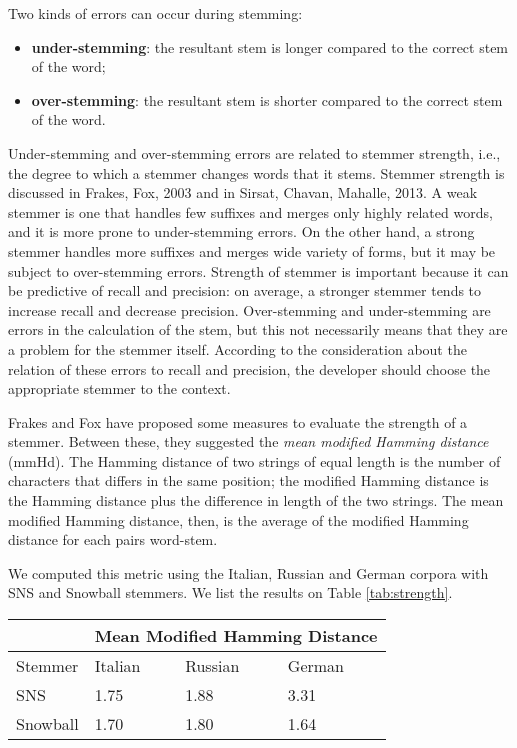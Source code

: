 Two kinds of errors can occur during stemming:

\begin{itemize}
\item \textbf{under-stemming}: the resultant stem is longer compared to the correct stem of the word;
\item \textbf{over-stemming}: the resultant stem is shorter compared to the correct stem of the word.
\end{itemize}

Under-stemming and over-stemming errors are related to stemmer strength, i.e., the degree to which a stemmer changes words that it stems. Stemmer strength is discussed in Frakes, Fox, 2003\cite{frakes} and in Sirsat, Chavan, Mahalle, 2013\cite{sirsat}. A weak stemmer is one that handles few suffixes and merges only highly related words, and it is more prone to under-stemming errors. On the other hand, a strong stemmer handles more suffixes and merges wide variety of forms, but it may be subject to over-stemming errors. Strength of stemmer is important because it can be
predictive of recall and precision: on average, a stronger stemmer tends to increase recall and decrease precision. Over-stemming and under-stemming are errors in the calculation of the stem, but this not necessarily means that they are a problem for the stemmer itself. According to the consideration about the relation of these errors to recall and precision, the developer should choose the appropriate stemmer to the context. 

Frakes and Fox have proposed some measures to evaluate the strength of a stemmer. Between these, they suggested the \emph{mean modified Hamming distance} (mmHd). The Hamming distance of two strings of equal length is the number of characters that differs in the same position; the modified Hamming distance is the Hamming distance plus the difference in length of the two strings. The mean modified Hamming distance, then, is the average of the modified Hamming distance for each pairs word-stem.

We computed this metric using the Italian, Russian and German corpora with SNS and Snowball stemmers. We list the results on Table \ref{tab:strength}.

\begin{center}
   \begin{tabular}{| l | l | l | l |}
    \hline
    & \multicolumn{3}{l|}{\textbf{Mean Modified Hamming Distance}}\\ \hline
    Stemmer & Italian & Russian & German\\ \hline
    SNS & 1.75 & 1.88 & 3.31 \\ \hline
    Snowball & 1.70 & 1.80 & 1.64\\ \hline    
    \end{tabular}
    \label{tab:strength}
\end{center}

